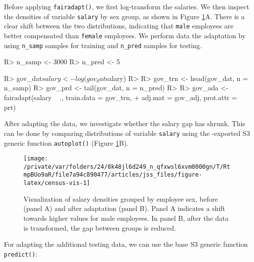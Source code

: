 \documentclass[
  nojss]{jss}
\begin{document}
Before applying \texttt{fairadapt()}, we first log-transform the
salaries. We then inspect the densities of variable \texttt{salary} by
sex group, as shown in Figure \ref{fig:census-vis}A. There is a clear
shift between the two distributions, indicating that \texttt{male}
employees are better compensated than \texttt{female} employees. We
perform data the adaptation by using \texttt{n\_samp} samples for
training and \texttt{n\_pred} samples for testing.

\begin{CodeChunk}
\begin{CodeInput}
R> n_samp <- 3000
R> n_pred <- 5
\end{CodeInput}
\end{CodeChunk}

\begin{CodeChunk}
\begin{CodeInput}
R> gov_dat$salary <- log(gov_dat$salary)
R> 
R> gov_trn <- head(gov_dat, n = n_samp)
R> gov_prd <- tail(gov_dat, n = n_pred)
R> 
R> gov_ada <- fairadapt(salary ~ ., train.data = gov_trn,
+                      adj.mat = gov_adj, prot.attr = prt)
\end{CodeInput}
\end{CodeChunk}

After adapting the data, we investigate whether the salary gap has
shrunk. This can be done by comparing distributions of variable
\texttt{salary} using the -exported S3 generic function
\texttt{autoplot()} (Figure \ref{fig:census-vis}B).

\begin{CodeChunk}
\begin{figure}

{\centering \texttt{[image: /private/var/folders/24/8k48jl6d249\_n\_qfxwsl6xvm0000gn/T/RtmpBUo9aR/file7a94c890477/articles/jss\_files/figure-latex/census-vis-1]} 

}

\caption[Visualization of salary densities grouped by employee sex, before (panel A) and after adaptation (panel B)]{Visualization of salary densities grouped by employee sex, before (panel A) and after adaptation (panel B). Panel A indicates a shift towards higher values for male employees. In panel B, after the data is transformed, the gap between groups is reduced.}\label{fig:census-vis}
\end{figure}
\end{CodeChunk}

For adapting the additional testing data, we can use the base
 S3 generic function \texttt{predict()}:
\end{document}
